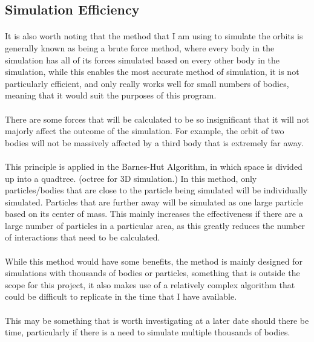 \subsection{Simulation Efficiency}
\paragraph{}
It is also worth noting that the method that I am using to simulate the orbits is generally known as being a brute force method, where every body in the simulation has all of its forces simulated based on every other body in the simulation, while this enables the most accurate method of simulation, it is not particularly efficient, and only really works well for small numbers of bodies, meaning that it would suit the purposes of this program.

\paragraph{}
There are some forces that will be calculated to be so insignificant that it will not majorly affect the outcome of the simulation. For example, the orbit of two bodies will not be massively affected by a third body that is extremely far away. 

\paragraph{}
This principle is applied in the Barnes-Hut Algorithm, in which space is divided up into a quadtree. (octree for 3D simulation.) In this method, only particles/bodies that are close to the particle being simulated will be individually simulated. Particles that are further away will be simulated as one large particle based on its center of mass. This mainly increases the effectiveness if there are a large number of particles in a particular area, as this greatly reduces the number of interactions that need to be calculated.

\paragraph{}
While this method would have some benefits, the method is mainly designed for simulations with thousands of bodies or particles, something that is outside the scope for this project, it also makes use of a relatively complex algorithm that could be difficult to replicate in the time that I have available.

\paragraph{}
This may be something that is worth investigating at a later date should there be time, particularly if there is a need to simulate multiple thousands of bodies.


